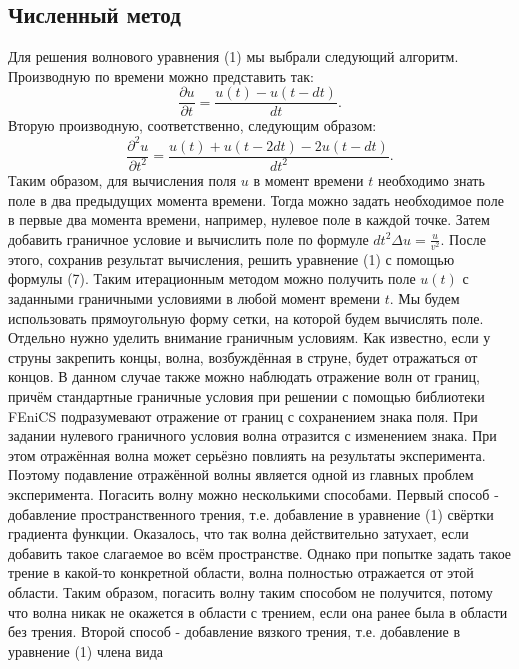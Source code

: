 \documentclass[
11pt,%
tightenlines,%
twoside,%
onecolumn,%
nofloats,%
nobibnotes,%
nofootinbib,%
superscriptaddress,%
noshowpacs,%
centertags]%
{revtex4}
\begin{document}
\subsection{Численный метод}
Для решения волнового уравнения (1) мы выбрали следующий алгоритм. Производную по времени можно
представить так:
\begin{equation}
    \frac{\partial u}{\partial t} = \frac{u(t) - u(t-dt)}{dt}.
\end{equation}
Вторую производную, соответственно, следующим образом:
\begin{equation}
    \frac{\partial^2u}{\partial t^2} = \frac{u(t) + u(t-2dt) - 2u(t-dt)}{dt^2}.
\end{equation}
Таким образом, для вычисления поля $u$ в момент времени $t$ необходимо знать поле в два предыдущих
момента времени. Тогда можно задать необходимое поле в первые два момента времени, например, нулевое
поле в каждой точке. Затем добавить граничное условие и вычислить поле по формуле $dt^2 \Delta u = 
\frac{u}{v^2}$. После этого, сохранив результат вычисления, решить уравнение (1) с помощью формулы
(7). Таким итерационным методом можно получить поле $u(t)$ с заданными граничными условиями
в любой момент времени $t$. Мы будем использовать прямоугольную форму сетки, на которой будем 
вычислять поле. \newline
Отдельно нужно уделить внимание граничным условиям. Как известно, если у струны закрепить концы, 
волна, возбуждённая в струне, будет отражаться от концов. В данном случае также можно наблюдать
отражение волн от границ, причём стандартные граничные условия при решении с помощью библиотеки
FEniCS подразумевают отражение от границ с сохранением знака поля. При задании нулевого граничного
условия волна отразится с изменением знака. При этом отражённая волна может серьёзно повлиять
на результаты эксперимента. Поэтому подавление отражённой волны является одной из главных проблем
эксперимента. \newline
Погасить волну можно несколькими способами. Первый способ - добавление пространственного трения, 
т.е. добавление в уравнение (1) свёртки градиента функции. Оказалось, что так волна действительно
затухает, если добавить такое слагаемое во всём пространстве. Однако при попытке задать такое трение
в какой-то конкретной области, волна полностью отражается от этой области. Таким образом, погасить
волну таким способом не получится, потому что волна никак не окажется в области с трением, если она 
ранее была в области без трения. \newline
Второй способ - добавление вязкого трения, т.е. добавление в уравнение (1) члена вида 
\end{document}
